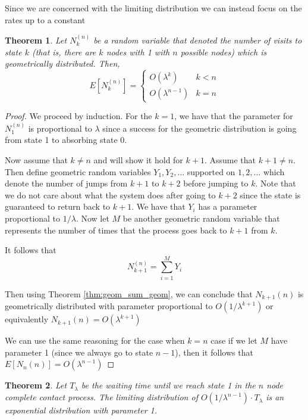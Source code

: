 \documentclass{article}
\theoremstyle{plain}
\newtheorem{theorem}{Theorem}[section]
\theoremstyle{definition}
\theoremstyle{remark}
\begin{document}
Since we are concerned with the limiting distribution we can instead focus on the rates up to a constant

\begin{theorem}
Let $N_k^{(n)}$ be a random variable that denoted the number of visits to state $k$ (that is, there are $k$ nodes with 1 with $n$ possible nodes) which is geometrically distributed. Then,
$$
E[N_k^{(n)}] = \begin{cases}
    O(\lambda^k) & k < n\\
    O(\lambda^{n - 1}) & k = n
\end{cases}
$$
\end{theorem}

\begin{proof}
We proceed by induction.
For the $k = 1$, we have that the parameter for $N_1^{(n)}$ is proportional to $\lambda$ since a success for the geometric distribution is going from state 1 to absorbing state 0.

Now assume that $k \not = n$ and will show it hold for $k + 1$.
Assume that $k + 1 \not = n$.
Then define geometric random variables $Y_1, Y_2, \ldots$ supported on $1,2,\ldots$ which denote the number of jumps from $k + 1$ to $k + 2$ before jumping to $k$.
Note that we do not care about what the system does after going to $k + 2$ since the state is guaranteed to return back to $k + 1$.
We have that $Y_i$ has a parameter proportional to $1/\lambda$.
Now let $M$ be another geometric random variable that represents the number of times that the process goes back to $k + 1$ from $k$.

It follows that
\begin{equation}
   N_{k + 1}^{(n)} = \sum_{i = 1}^M Y_i
\end{equation}

Then using Theorem \eqref{thm:geom_sum_geom}, we can conclude that $N_{k + 1}{(n)}$ is geometrically distributed with parameter proportional to $O(1/\lambda^{k + 1})$ or equivalently $N_{k + 1}{(n)} = O(\lambda^{k + 1})$

We can use the same reasoning for the case when $k = n$ case if we let $M$ have parameter 1 (since we always go to state $n - 1$), then it follows that $E[N_{n}{(n)}] = O(\lambda^{n - 1})$
\end{proof}

\begin{theorem}
Let $T_\lambda$ be the waiting time until we reach state 1 in the $n$ node complete contact process.
The limiting distribution of $O(1/\lambda^{n - 1}) \cdot T_\lambda$ is an exponential distribution with parameter 1.
\end{theorem}
\end{document}
